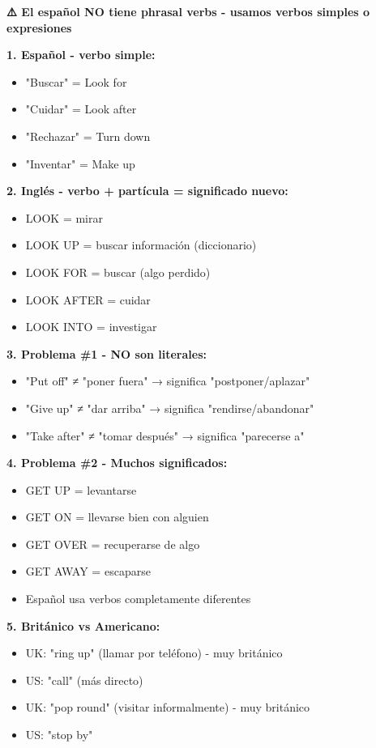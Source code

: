 \begin{comparisonbox}[title=🇪🇸 Phrasal Verbs: NO existen en español - Pesadilla para hispanohablantes]
\textbf{⚠️ El español NO tiene phrasal verbs - usamos verbos simples o expresiones}

\textbf{1. Español - verbo simple:}
\begin{itemize}
    \item "Buscar" = Look for
    \item "Cuidar" = Look after
    \item "Rechazar" = Turn down
    \item "Inventar" = Make up
\end{itemize}

\textbf{2. Inglés - verbo + partícula = significado nuevo:}
\begin{itemize}
    \item LOOK = mirar
    \item LOOK UP = buscar información (diccionario)
    \item LOOK FOR = buscar (algo perdido)
    \item LOOK AFTER = cuidar
    \item LOOK INTO = investigar
\end{itemize}

\textbf{3. Problema \#1 - NO son literales:}
\begin{itemize}
    \item "Put off" ≠ "poner fuera" → significa "postponer/aplazar"
    \item "Give up" ≠ "dar arriba" → significa "rendirse/abandonar"
    \item "Take after" ≠ "tomar después" → significa "parecerse a"
\end{itemize}

\textbf{4. Problema \#2 - Muchos significados:}
\begin{itemize}
    \item GET UP = levantarse
    \item GET ON = llevarse bien con alguien
    \item GET OVER = recuperarse de algo
    \item GET AWAY = escaparse
    \item Español usa verbos completamente diferentes
\end{itemize}

\textbf{5. Británico vs Americano:}
\begin{itemize}
    \item UK: "ring up" (llamar por teléfono) - muy británico
    \item US: "call" (más directo)
    \item UK: "pop round" (visitar informalmente) - muy británico
    \item US: "stop by"
\end{itemize}


\end{comparisonbox}
